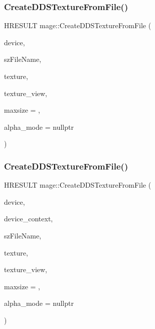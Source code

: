 \subsubsection{\texorpdfstring{Create\+D\+D\+S\+Texture\+From\+File()}{CreateDDSTextureFromFile()}\hspace{0.1cm}{\footnotesize\ttfamily [1/4]}}
{\footnotesize\ttfamily H\+R\+E\+S\+U\+LT mage\+::\+Create\+D\+D\+S\+Texture\+From\+File (\begin{DoxyParamCaption}\item[{\+\_\+\+In\+\_\+ I\+D3\+D11\+Device2 $\ast$}]{device,  }\item[{\+\_\+\+In\+\_\+z\+\_\+ const wchar\+\_\+t $\ast$}]{sz\+File\+Name,  }\item[{\+\_\+\+Outptr\+\_\+opt\+\_\+ I\+D3\+D11\+Resource $\ast$$\ast$}]{texture,  }\item[{\+\_\+\+Outptr\+\_\+opt\+\_\+ I\+D3\+D11\+Shader\+Resource\+View $\ast$$\ast$}]{texture\+\_\+view,  }\item[{\+\_\+\+In\+\_\+ size\+\_\+t}]{maxsize = {},  }\item[{\+\_\+\+Out\+\_\+opt\+\_\+ \hyperlink{namespacemage_a0c586a2bad862f4858900ca121ca80c2}{D\+D\+S\+\_\+\+A\+L\+P\+H\+A\+\_\+\+M\+O\+DE} $\ast$}]{alpha\+\_\+mode = {\ttfamily nullptr} }\end{DoxyParamCaption})}

\hypertarget{namespacemage_abec1d90d8e2d6c8ce1bfa74c2854bdfe}{}\label{namespacemage_abec1d90d8e2d6c8ce1bfa74c2854bdfe} 
\subsubsection{\texorpdfstring{Create\+D\+D\+S\+Texture\+From\+File()}{CreateDDSTextureFromFile()}\hspace{0.1cm}{\footnotesize\ttfamily [2/4]}}
{\footnotesize\ttfamily H\+R\+E\+S\+U\+LT mage\+::\+Create\+D\+D\+S\+Texture\+From\+File (\begin{DoxyParamCaption}\item[{\+\_\+\+In\+\_\+ I\+D3\+D11\+Device2 $\ast$}]{device,  }\item[{\+\_\+\+In\+\_\+opt\+\_\+ I\+D3\+D11\+Device\+Context $\ast$}]{device\+\_\+context,  }\item[{\+\_\+\+In\+\_\+z\+\_\+ const wchar\+\_\+t $\ast$}]{sz\+File\+Name,  }\item[{\+\_\+\+Outptr\+\_\+opt\+\_\+ I\+D3\+D11\+Resource $\ast$$\ast$}]{texture,  }\item[{\+\_\+\+Outptr\+\_\+opt\+\_\+ I\+D3\+D11\+Shader\+Resource\+View $\ast$$\ast$}]{texture\+\_\+view,  }\item[{\+\_\+\+In\+\_\+ size\+\_\+t}]{maxsize = {},  }\item[{\+\_\+\+Out\+\_\+opt\+\_\+ \hyperlink{namespacemage_a0c586a2bad862f4858900ca121ca80c2}{D\+D\+S\+\_\+\+A\+L\+P\+H\+A\+\_\+\+M\+O\+DE} $\ast$}]{alpha\+\_\+mode = {\ttfamily nullptr} }\end{DoxyParamCaption})}

